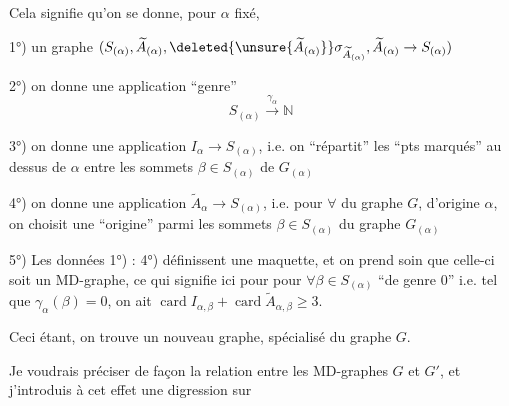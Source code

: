 Cela signifie qu'on se donne, pour $\alpha$ fixé,

1°) un graphe  $(S_{(\alpha)},\widetilde A_{(\alpha)},\deleted{\unsure{\widetilde A_{(\alpha)}}}\sigma_{\widetilde A_{(\alpha)}},\widetilde A_{(\alpha)}\to S_{(\alpha)})$

2°) on  donne une application ``genre''
\[
S_{(\alpha)}\xrightarrow{\gamma_\alpha}\mathbb N
\]

3°) on donne une application $I_\alpha\to S_{(\alpha)}$, i.e. on ``répartit'' les  ``pts marqués'' au dessus de $\alpha$  entre les sommets $\beta\in S_{(\alpha)}$ de $G_{(\alpha)}$

4°) on donne une application $\widetilde A_\alpha\to S_{(\alpha)}$, i.e. pour $\forall$  du graphe $G$, d'origine $\alpha$, on  choisit une  ``origine'' parmi les sommets $\beta\in S_{(\alpha)}$ du graphe $G_{(\alpha)}$

5°) Les données 1°) : 4°) définissent une maquette,  et on prend soin que celle-ci soit un MD-graphe,  ce qui signifie ici pour pour $\forall\beta\in S_{(\alpha)}$ ``de genre 0'' i.e. tel que $\gamma_\alpha(\beta)=0$, on ait $\operatorname{card}I_{\alpha,\beta}+\operatorname{card}\widetilde A_{\alpha,\beta}\geq 3$.

Ceci étant, on trouve un nouveau graphe,  spécialisé du graphe $G$.

Je voudrais préciser de façon  la relation entre les MD-graphes $G$ et $G'$, et j'introduis à cet effet une digression sur
